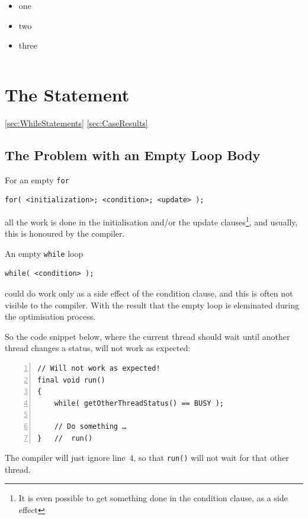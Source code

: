\begin{itemize}[nosep]
\item{one}
\item{two}
\item{three}
\end{itemize}

\begin{lstlisting}[numbers=left]
\end{lstlisting}


\section{The  Statement}\label{sec:TheWhileStatement}

\ref{sec:WhileStatements}
\ref{sec:CaseResults}
\autocite{ORACLE_DOC_PATTERNMATCHING}

\autocite{ORACLE_DOC_LANGUAGE_SPECIFICATION:While}


\subsection{The Problem with an Empty Loop Body}\label{sec:EmptyWhile}
For an empty \lstinline|for|
\begin{lstlisting}
for( <initialization>; <condition>; <update> );
\end{lstlisting}
all the work is done in the initialisation and/or the update clauses\footnote{It is even possible to get something done in the condition clause, as a side effect}, and usually, this is honoured by the compiler.

An empty \lstinline|while| loop
\begin{lstlisting}
while( <condition> );
\end{lstlisting}
could do work only as a side effect of the condition clause, and this is often not visible to the compiler. With the result that the empty loop is eleminated during the optimisation process.

So the code snippet below, where the current thread should wait until another thread changes a status, will not work as expected:
\begin{lstlisting}[numbers=left]
// Will not work as expected!
final void run()
{
    while( getOtherThreadStatus() == BUSY );
    
    // Do something …
}   //  run()
\end{lstlisting}
The compiler will just ignore line~4, so that \lstinline|run()| will not wait for that other thread.

